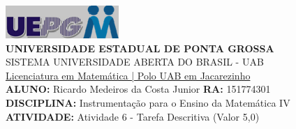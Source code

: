 \documentclass[a4paper, 12pt]{article}
\begin{document}
\includegraphics{logo}\\
\textbf{UNIVERSIDADE ESTADUAL DE PONTA GROSSA} \\
SISTEMA UNIVERSIDADE ABERTA DO BRASIL - UAB \\
\underline{Licenciatura em Matemática | Polo UAB em Jacarezinho} \\
\textbf{ALUNO:} Ricardo Medeiros da Costa Junior   \textbf{RA:} 151774301 \\
\textbf{DISCIPLINA:} Instrumentação para o Ensino da Matemática IV \\
\textbf{ATIVIDADE:} Atividade 6 - Tarefa Descritiva (Valor 5,0) \\
\end{document}
